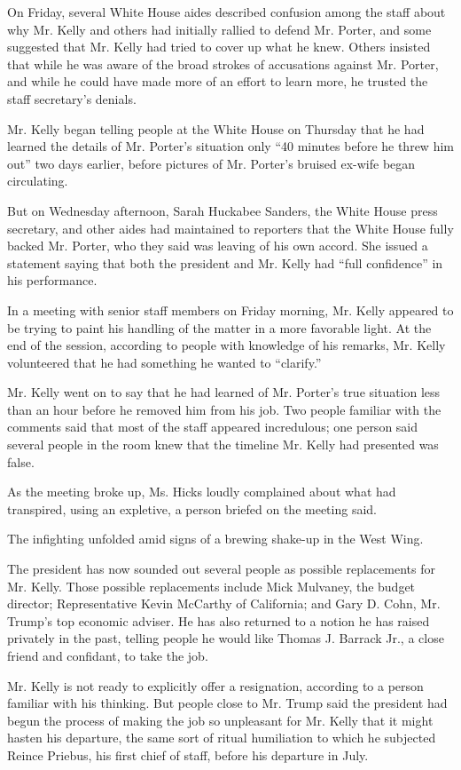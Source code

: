 On Friday, several White House aides described confusion among the staff
about why Mr. Kelly and others had initially rallied to defend Mr.
Porter, and some suggested that Mr. Kelly had tried to cover up what he
knew. Others insisted that while he was aware of the broad strokes of
accusations against Mr. Porter, and while he could have made more of an
effort to learn more, he trusted the staff secretary's denials.

Mr. Kelly began telling people at the White House on Thursday that he
had learned the details of Mr. Porter's situation only ``40 minutes
before he threw him out'' two days earlier, before pictures of Mr.
Porter's bruised ex-wife began circulating.

But on Wednesday afternoon, Sarah Huckabee Sanders, the White House
press secretary, and other aides had maintained to reporters that the
White House fully backed Mr. Porter, who they said was leaving of his
own accord. She issued a statement saying that both the president and
Mr. Kelly had ``full confidence'' in his performance.

In a meeting with senior staff members on Friday morning, Mr. Kelly
appeared to be trying to paint his handling of the matter in a more
favorable light. At the end of the session, according to people with
knowledge of his remarks, Mr. Kelly volunteered that he had something he
wanted to ``clarify.''

Mr. Kelly went on to say that he had learned of Mr. Porter's true
situation less than an hour before he removed him from his job. Two
people familiar with the comments said that most of the staff appeared
incredulous; one person said several people in the room knew that the
timeline Mr. Kelly had presented was false.

As the meeting broke up, Ms. Hicks loudly complained about what had
transpired, using an expletive, a person briefed on the meeting said.

The infighting unfolded amid signs of a brewing shake-up in the West
Wing.

The president has now sounded out several people as possible
replacements for Mr. Kelly. Those possible replacements include Mick
Mulvaney, the budget director; Representative Kevin McCarthy of
California; and Gary D. Cohn, Mr. Trump's top economic adviser. He has
also returned to a notion he has raised privately in the past, telling
people he would like Thomas J. Barrack Jr., a close friend and
confidant, to take the job.

Mr. Kelly is not ready to explicitly offer a resignation, according to a
person familiar with his thinking. But people close to Mr. Trump said
the president had begun the process of making the job so unpleasant for
Mr. Kelly that it might hasten his departure, the same sort of ritual
humiliation to which he subjected Reince Priebus, his first chief of
staff, before his departure in July.

